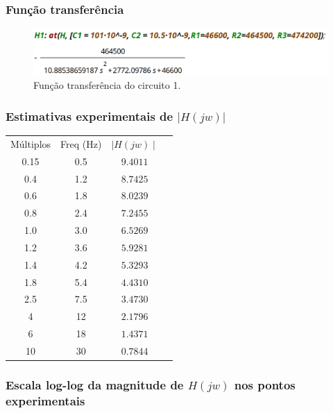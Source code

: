 \documentclass[12pt,twoside, a4paper, twocolumn]{article}
\begin{document}
\subsubsection{Função transferência}


\begin{figure}[h]
    \centering
    \includegraphics[width=1\columnwidth]{images/H1valoresreais.png}
    \caption{Função transferência do circuito 1.}
\end{figure}


\subsubsection{Estimativas experimentais de $ | H(jw) | $}


\begin{center}
    \begin{tabular}{ |c|c|c|c| }
        \hline
        Múltiplos & Freq (Hz) & $\mid H(jw) \mid$ \\
        0.15      & 0.5       & $9.4011$          \\
        0.4       & 1.2       & $8.7425$          \\
        0.6       & 1.8       & $8.0239$          \\
        0.8       & 2.4       & $7.2455$          \\
        1.0       & 3.0       & $6.5269$          \\
        1.2       & 3.6       & $5.9281$          \\
        1.4       & 4.2       & $5.3293$          \\
        1.8       & 5.4       & $4.4310$          \\
        2.5       & 7.5       & $3.4730$          \\
        4         & 12        & $2.1796$          \\
        6         & 18        & $1.4371$          \\
        10        & 30        & $0.7844$          \\
        \hline
    \end{tabular}
\end{center}


\subsubsection*{Escala log-log da magnitude de $H(jw)$ nos pontos experimentais}
\end{document}
